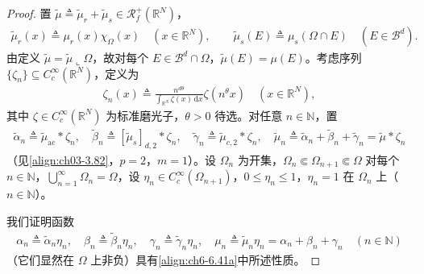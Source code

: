 \documentclass[../../main.tex]{subfiles}%
\begin{document}
\begin{proof}
置 $\widetilde\mu\triangleq \widetilde\mu_r+\widetilde\mu_s\in\mathscr{R}^+_f(\mathbb{R}^N)$，
\begin{align*}
\widetilde\mu_r(x)\triangleq \mu_r(x)\chi_\Omega(x)\quad(x\in\mathbb{R}^N),\qquad
\widetilde\mu_s(E)\triangleq \mu_s(\Omega\cap E)\quad(E\in\mathscr{B}^d).
\end{align*}
由定义 $\widetilde\mu=\widetilde\mu\llcorner\Omega$，故对每个 $E\in\mathscr{B}^d\cap\Omega$，$\widetilde\mu(E)=\mu(E)$。考虑序列 $\{\zeta_n\}\subseteq C^\infty_c(\mathbb{R}^N)$，定义为
\begin{align}
\zeta_n(x)\triangleq \frac{n^{d\theta}}{\int_{\mathbb{R}^N}\zeta(x)\,\mathrm{d}x}\zeta(n^\theta x) \quad(x\in\mathbb{R}^N), \label{align:ch6-6.42}
\end{align}
其中 $\zeta\in C^\infty_c(\mathbb{R}^N)$ 为标准磨光子，$\theta>0$ 待选。对任意 $n\in\mathbb{N}$，置
\begin{align*}
\widetilde\alpha_n\triangleq \widetilde\mu_{\mathrm{ac}}*\zeta_n,\quad
\widetilde\beta_n\triangleq [\widetilde\mu_s]_{d,2}*\zeta_n,\quad
\widetilde\gamma_n\triangleq \widetilde\mu_{c,2}*\zeta_n,\quad
\widetilde\mu_n\triangleq \widetilde\alpha_n+\widetilde\beta_n+\widetilde\gamma_n=\widetilde\mu*\zeta_n
\end{align*}
（见\eqref{align:ch03-3.82}，$p=2$，$m=1$）。设 $\Omega_n$ 为开集，$\Omega_n\Subset\Omega_{n+1}\Subset\Omega$ 对每个 $n\in\mathbb{N}$，$\bigcup_{n=1}^\infty\Omega_n=\Omega$，设 $\eta_n\in C^\infty_c(\Omega_{n+1})$，$0\leqslant\eta_n\leqslant1$，$\eta_n=1$ 在 $\Omega_n$ 上（$n\in\mathbb{N}$）。

我们证明函数
\begin{align*}
\alpha_n\triangleq \widetilde\alpha_n\eta_n,\quad
\beta_n\triangleq \widetilde\beta_n\eta_n,\quad
\gamma_n\triangleq \widetilde\gamma_n\eta_n,\quad
\mu_n\triangleq \widetilde\mu_n\eta_n=\alpha_n+\beta_n+\gamma_n\quad(n\in\mathbb{N})
\end{align*}
（它们显然在 $\Omega$ 上非负）具有\eqref{align:ch6-6.41a}中所述性质。


\end{proof}
\end{document}

